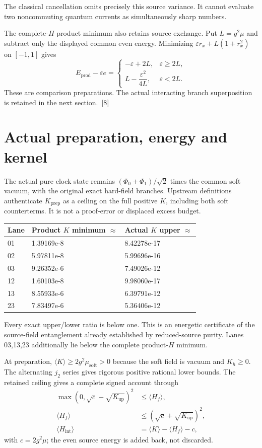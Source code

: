 \documentclass[10pt,twocolumn,letterpaper]{article}
\begin{document}
The classical cancellation omits precisely this source variance. It cannot evaluate two noncommuting quantum currents as simultaneously sharp numbers.

The complete-$H$ product minimum also retains source exchange. Put $L=g^2\mu$ and subtract only the displayed common even energy. Minimizing $\varepsilon r_x+L(1+r_x^2)$ on $[-1,1]$ gives
\[
E_{\mathrm{prod}}-\varepsilon e=
\begin{cases}
-\varepsilon+2L,&\varepsilon\geq2L,\\
L-\dfrac{\varepsilon^2}{4L},&\varepsilon<2L.
\end{cases}
\]
These are comparison preparations. The actual interacting branch superposition is retained in the next section.~[8]

\section{Actual preparation, energy and kernel}
The actual pure clock state remains $(\Phi_0+\Phi_1)/\sqrt2$ times the common soft vacuum, with the original exact hard-field branches. Upstream definitions authenticate $K_{\mathrm{prep}}$ as a ceiling on the full positive $K$, including both soft counterterms. It is not a proof-error or displaced excess budget.

\begin{center}\small
\begin{tabular}{@{}lll@{}}\toprule
Lane & Product $K$ minimum $\approx$ & Actual $K$ upper $\approx$\\\midrule
01 & 1.39169e-8 & 8.42278e-17\\
02 & 5.97811e-8 & 5.99696e-16\\
03 & 9.26352e-6 & 7.49026e-12\\
12 & 1.60103e-8 & 9.98060e-17\\
13 & 8.55933e-6 & 6.39791e-12\\
23 & 7.83497e-6 & 5.36406e-12\\\bottomrule
\end{tabular}\end{center}
Every exact upper/lower ratio is below one. This is an energetic certificate of the source-field entanglement already established by reduced-source purity. Lanes 03,13,23 additionally lie below the complete product-$H$ minimum.

At preparation, $\langle K\rangle\geq2g^2\mu_{\mathrm{soft}}>0$ because the soft field is vacuum and $K_h\geq0$. The alternating $j_2$ series gives rigorous positive rational lower bounds. The retained ceiling gives a complete signed account through
\[
\begin{aligned}
\max(0,\sqrt c-\sqrt{K_{\mathrm{up}}})^2&\leq\langle H_f\rangle,\\
\langle H_f\rangle&\leq(\sqrt c+\sqrt{K_{\mathrm{up}}})^2,\\
\langle H_{\mathrm{int}}\rangle&=\langle K\rangle-\langle H_f\rangle-c,
\end{aligned}
\]
with $c=2g^2\mu$; the even source energy is added back, not discarded.
\end{document}
